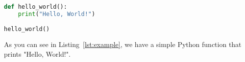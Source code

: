 \documentclass{article}
\begin{document}
\begin{lstlisting}[language=Python, caption={Example Python code}, label=lst:example]
def hello_world():
    print("Hello, World!")

hello_world()
\end{lstlisting}

As you can see in Listing~\ref{lst:example}, we have a simple Python function that prints "Hello, World!".
\end{document}
